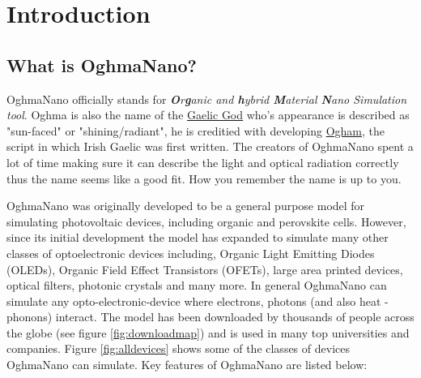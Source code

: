 \chapter{Introduction}
\section{What is OghmaNano?} 
OghmaNano officially stands for \emph{\textbf{O}r\textbf{g}anic and \textbf{h}ybrid \textbf{M}aterial \textbf{N}ano Simulation tool}.  Oghma is also the name of the \href{https://en.wikipedia.org/wiki/Ogma}{Gaelic God} who's appearance is described as "sun-faced" or "shining/radiant", he is creditied with developing \href{https://en.wikipedia.org/wiki/Ogham}{Ogham}, the script in which Irish Gaelic was first written. The creators of OghmaNano spent a lot of time making sure it can describe the light and optical radiation correctly thus the name seems like a good fit. How you remember the name is up to you.

OghmaNano was originally developed to be a general purpose model for simulating photovoltaic devices, including organic and perovskite cells. However, since its initial development the model has expanded to simulate many other classes of optoelectronic devices including, Organic Light Emitting Diodes (OLEDs), Organic Field Effect Transistors (OFETs), large area printed devices, optical filters, photonic crystals and many more.  In general OghmaNano can simulate any opto-electronic-device where electrons, photons (and also heat - phonons) interact.  The model has been downloaded by thousands of people across the globe (see figure \ref{fig:downloadmap}) and is used in many top universities and companies. Figure \ref{fig:alldevices} shows some of the classes of devices OghmaNano can simulate.  Key features of OghmaNano are listed below:


